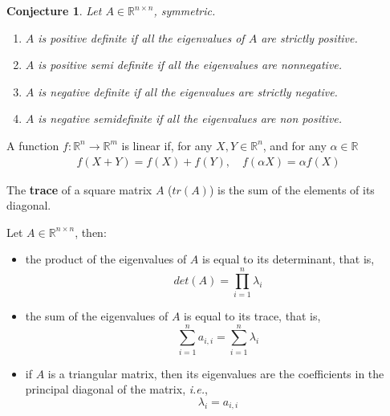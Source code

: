 \documentclass[aspectratio=169]{beamer}
\newtheorem{proposition}{Conjecture}[section]
\begin{document}
\begin{frame}
    \begin{proposition}
        Let $A\in\mathbb{R}^{n\times n}$, symmetric.
        
        \begin{enumerate}
            \item $A$ is positive definite if all the eigenvalues of $A$ are strictly positive.
            \item $A$ is positive semi definite if all the eigenvalues are nonnegative.
            \item $A$ is negative definite if all the eigenvalues are strictly negative.
            \item $A$ is negative semidefinite if all the eigenvalues are non positive.
        \end{enumerate}
    \end{proposition}
\end{frame}

\begin{frame}
\begin{definition}
    A function $f:\mathbb{R}^n\rightarrow\mathbb{R}^m$ is linear if, for any $X,Y\in\mathbb{R}^n$, and for any $\alpha\in\mathbb{R}$
    \begin{align*}
        f(X+Y)=f(X)+f(Y),\quad f(\alpha X)=\alpha f(X)
    \end{align*}
\end{definition}
\end{frame}

\begin{frame}
    \begin{definition}
        The \textbf{trace} of a square matrix $A$ ($tr(A)$) is the sum of the elements of its diagonal.
    \end{definition}
\end{frame}

\begin{frame}
    \begin{theorem}
    Let $A\in\mathbb{R}^{n\times n}$, then:
    \begin{itemize}
        \item the product of the eigenvalues of $A$ is equal to its determinant, that is,\[det(A)=\prod_{i=1}^n \lambda_i\]
        \item the sum of the eigenvalues of $A$ is equal to its trace, that is, \[\sum_{i=1}^n a_{i,i} =\sum_{i=1}^n \lambda_i\]
        \item if $A$ is a triangular matrix, then its eigenvalues are the coefficients in the principal diagonal of the matrix, \emph{i.e.}, \[\lambda_i = a_{i,i}\]
    \end{itemize}
    \end{theorem}
\end{frame}
\end{document}
